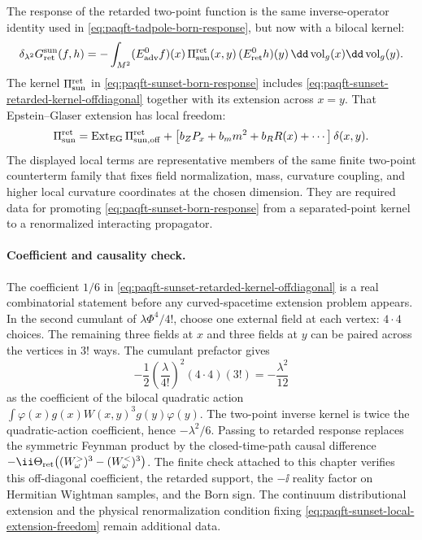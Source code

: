 The response of the retarded two-point function is the same inverse-operator
identity used in \eqref{eq:paqft-tadpole-born-response}, but now with a
bilocal kernel:
\begin{equation}
  \delta_{\lambda^2}G_{\rm ret}^{\rm sun}(f,h)
  =
  -\int_{M^2}
  (E_{\rm adv}^0f)(x)\,
  \Pi_{\rm sun}^{\rm ret}(x,y)\,
  (E_{\rm ret}^0h)(y)\,
  \dd\operatorname{vol}_g(x)\dd\operatorname{vol}_g(y).
  \label{eq:paqft-sunset-born-response}
\end{equation}
The kernel \(\Pi_{\rm sun}^{\rm ret}\) in
\eqref{eq:paqft-sunset-born-response} includes
\eqref{eq:paqft-sunset-retarded-kernel-offdiagonal} together with its extension
across \(x=y\).  That Epstein--Glaser extension has local freedom:
\begin{equation}
  \Pi_{\rm sun}^{\rm ret}
  =
  \operatorname{Ext}_{\rm EG}
  \Pi_{\rm sun,off}^{\rm ret}
  +
  \left[
    b_ZP_x+b_m m^2+b_R R(x)+\cdots
  \right]\delta(x,y).
  \label{eq:paqft-sunset-local-extension-freedom}
\end{equation}
The displayed local terms are representative members of the same finite
two-point counterterm family that fixes field normalization, mass, curvature
coupling, and higher local curvature coordinates at the chosen dimension.
They are required data for promoting
\eqref{eq:paqft-sunset-born-response} from a separated-point kernel to a
renormalized interacting propagator.

\paragraph{Coefficient and causality check.}
The coefficient \(1/6\) in
\eqref{eq:paqft-sunset-retarded-kernel-offdiagonal} is a real combinatorial
statement before any curved-spacetime extension problem appears.  In the
second cumulant of
\(\lambda\Phi^4/4!\), choose one external field at each vertex: \(4\cdot4\)
choices.  The remaining three fields at \(x\) and three fields at \(y\) can
be paired across the vertices in \(3!\) ways.  The cumulant prefactor gives
\[
  -\frac12\left(\frac{\lambda}{4!}\right)^2(4\cdot4)(3!)
  =
  -\frac{\lambda^2}{12}
\]
as the coefficient of the bilocal quadratic action
\(\int\varphi(x)g(x)W(x,y)^3g(y)\varphi(y)\).  The two-point inverse kernel
is twice the quadratic-action coefficient, hence
\(-\lambda^2/6\).  Passing to retarded response replaces the symmetric
Feynman product by the closed-time-path causal difference
\(-\ii\Theta_{\rm ret}\bigl((W_\omega^>)^3-(W_\omega^<)^3\bigr)\).  The finite
check attached to this chapter verifies this off-diagonal coefficient, the
retarded support, the \(-\ii\) reality factor on Hermitian Wightman samples, and
the Born sign.  The continuum distributional extension and the physical
renormalization condition fixing
\eqref{eq:paqft-sunset-local-extension-freedom} remain additional data.

